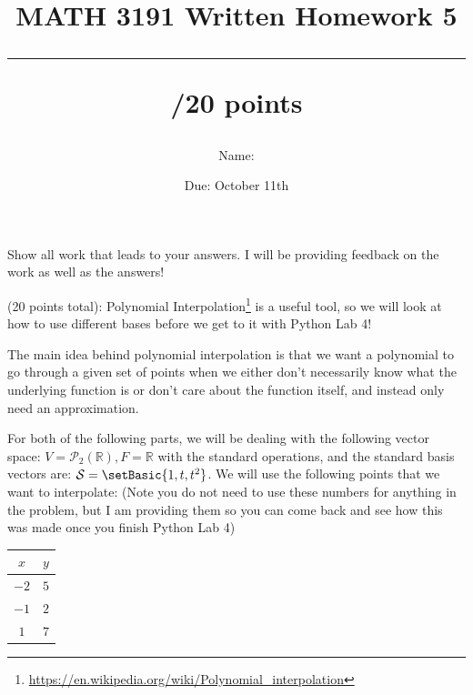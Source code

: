 \documentclass{exam}
\title{MATH 3191 Written Homework 5\\\rule{30pt}{1pt}/20 points}
\author{Name: \rule{150pt}{1pt}}
\date{Due: October 11th}
\begin{document}
\maketitle
Show all work that leads to your answers. I will be providing feedback on the work as well as the answers!
\begin{questions}
    \question (20 points total):
    Polynomial Interpolation\footnote{\url{https://en.wikipedia.org/wiki/Polynomial_interpolation}}
    is a useful tool, so we will look at how to use different bases before we get to it with
    Python Lab 4!

    The main idea behind polynomial interpolation is that we want a polynomial to go through a given
    set of points when we either don't necessarily know what the underlying function is or don't care
    about the function itself, and instead only need an approximation.

    For both of the following parts, we will be dealing with the following vector space:
    $V = \mathcal{P}_2(\mathbb{R}), F=\mathbb{R}$ with the standard operations, and the standard
    basis vectors are: $\mathcal{S} = \setBasic{1, t, t^2}$. We will use the following points
    that we want to interpolate: (Note you do not need to use these numbers for anything in the problem,
    but I am providing them so you can come back and see how this was made once you finish Python Lab 4)

    \begin{center}
        \begin{tabular}{|c|c|}
            \hline
            $x$  & $y$ \\
            \hline
            \hline
            $-2$ & $5$ \\
            $-1$ & $2$ \\
            $1$  & $7$ \\
            \hline
        \end{tabular}
    \end{center}
\end{questions}
\end{document}
